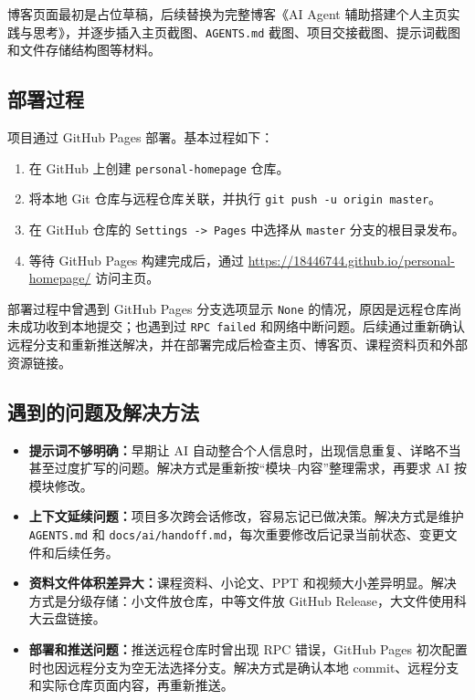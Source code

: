 \documentclass[UTF8,a4paper,12pt]{ctexart}
\begin{document}
博客页面最初是占位草稿，后续替换为完整博客《AI Agent 辅助搭建个人主页实践与思考》，并逐步插入主页截图、\texttt{AGENTS.md} 截图、项目交接截图、提示词截图和文件存储结构图等材料。

\subsection{部署过程}

项目通过 GitHub Pages 部署。基本过程如下：

\begin{enumerate}
  \item 在 GitHub 上创建 \texttt{personal-homepage} 仓库。
  \item 将本地 Git 仓库与远程仓库关联，并执行 \texttt{git push -u origin master}。
  \item 在 GitHub 仓库的 \texttt{Settings -> Pages} 中选择从 \texttt{master} 分支的根目录发布。
  \item 等待 GitHub Pages 构建完成后，通过 \url{https://18446744.github.io/personal-homepage/} 访问主页。
\end{enumerate}

部署过程中曾遇到 GitHub Pages 分支选项显示 \texttt{None} 的情况，原因是远程仓库尚未成功收到本地提交；也遇到过 \texttt{RPC failed} 和网络中断问题。后续通过重新确认远程分支和重新推送解决，并在部署完成后检查主页、博客页、课程资料页和外部资源链接。

\subsection{遇到的问题及解决方法}

\begin{itemize}
  \item \textbf{提示词不够明确：}早期让 AI 自动整合个人信息时，出现信息重复、详略不当甚至过度扩写的问题。解决方式是重新按“模块--内容”整理需求，再要求 AI 按模块修改。
  \item \textbf{上下文延续问题：}项目多次跨会话修改，容易忘记已做决策。解决方式是维护 \texttt{AGENTS.md} 和 \texttt{docs/ai/handoff.md}，每次重要修改后记录当前状态、变更文件和后续任务。
  \item \textbf{资料文件体积差异大：}课程资料、小论文、PPT 和视频大小差异明显。解决方式是分级存储：小文件放仓库，中等文件放 GitHub Release，大文件使用科大云盘链接。
  \item \textbf{部署和推送问题：}推送远程仓库时曾出现 RPC 错误，GitHub Pages 初次配置时也因远程分支为空无法选择分支。解决方式是确认本地 commit、远程分支和实际仓库页面内容，再重新推送。
\end{itemize}
\end{document}
